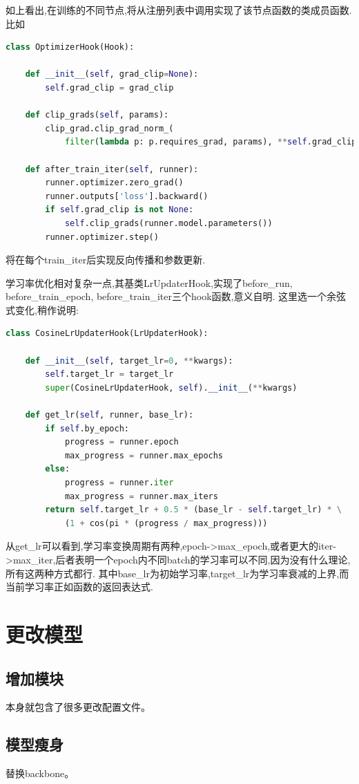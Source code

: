 \documentclass[UTF8]{ctexart}
\begin{document}
如上看出,在训练的不同节点,将从注册列表中调用实现了该节点函数的类成员函数.比如
\lstset{style=mystyle}
\begin{lstlisting}[language=Python]
class OptimizerHook(Hook):

    def __init__(self, grad_clip=None):
        self.grad_clip = grad_clip

    def clip_grads(self, params):
        clip_grad.clip_grad_norm_(
            filter(lambda p: p.requires_grad, params), **self.grad_clip)

    def after_train_iter(self, runner):
        runner.optimizer.zero_grad()
        runner.outputs['loss'].backward()
        if self.grad_clip is not None:
            self.clip_grads(runner.model.parameters())
        runner.optimizer.step()
\end{lstlisting}
将在每个train\_iter后实现反向传播和参数更新.

学习率优化相对复杂一点,其基类LrUpdaterHook,实现了before\_run, before\_train\_epoch, before\_train\_iter三个hook函数,意义自明.
这里选一个余弦式变化,稍作说明:

\lstset{style=mystyle}
\begin{lstlisting}[language=Python]
class CosineLrUpdaterHook(LrUpdaterHook):

    def __init__(self, target_lr=0, **kwargs):
        self.target_lr = target_lr
        super(CosineLrUpdaterHook, self).__init__(**kwargs)

    def get_lr(self, runner, base_lr):
        if self.by_epoch:
            progress = runner.epoch
            max_progress = runner.max_epochs
        else:
            progress = runner.iter
            max_progress = runner.max_iters
        return self.target_lr + 0.5 * (base_lr - self.target_lr) * \
			(1 + cos(pi * (progress / max_progress)))
\end{lstlisting}
从get\_lr可以看到,学习率变换周期有两种,epoch->max\_epoch,或者更大的iter->max\_iter,后者表明一个epoch内不同batch的学习率可以不同,因为没有什么理论,所有这两种方式都行.
其中base\_lr为初始学习率,target\_lr为学习率衰减的上界,而当前学习率正如函数的返回表达式.

\section{更改模型}
\subsection{增加模块}
本身就包含了很多更改配置文件。
\subsection{模型瘦身}
替换backbone。
\end{document}

